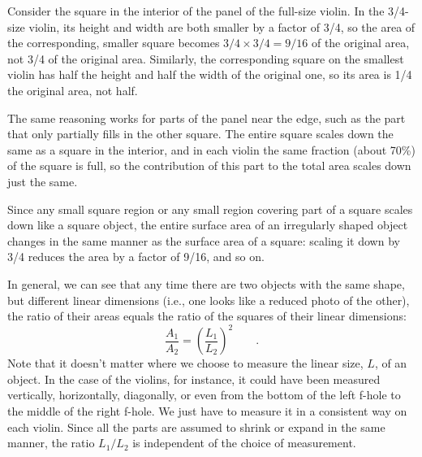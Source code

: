Consider the square in the interior of the panel of the
full-size violin. In the 3/4-size violin, its height and
width are both smaller by a factor of 3/4, so the area of
the corresponding, smaller square becomes $3/4\times3/4=9/16$ of
the original area, not 3/4 of the original area. Similarly,
the corresponding square on the smallest violin has half the
height and half the width of the original one, so its area
is 1/4 the original area, not half.

The same reasoning works for parts of the panel near the
edge, such as the part that only partially fills in the
other square. The entire square scales down the same as a
square in the interior, and in each violin the same fraction
(about 70\%) of the square is full, so the contribution of
this part to the total area scales down just the same.


Since any small square region or any small region covering
part of a square scales down like a square object, the
entire surface area of an irregularly shaped object changes
in the same manner as the surface area of a square: scaling
it down by 3/4 reduces the area by a factor of 9/16, and so on.

In general, we can see that any time there are two objects
with the same shape, but different linear dimensions (i.e.,
one looks like a reduced photo of the other), the ratio of
their areas equals the ratio of the squares of their linear dimensions:
\begin{equation*}
 \frac{A_1}{A_2} = \left(\frac{L_1}{L_2}\right)^2 \qquad .
\end{equation*}
Note that it doesn't matter where we choose to measure the
linear size, $L$, of an object. In the case of the violins,
for instance, it could have been measured vertically,
horizontally, diagonally, or even from the bottom of the
left f-hole to the middle of the right f-hole. We just have
to measure it in a consistent way on each violin. Since all
the parts are assumed to shrink or expand in the same
manner, the ratio $L_1/L_2$ is independent of the choice of measurement.


 


